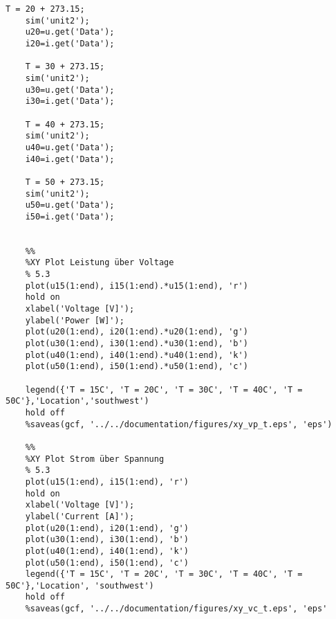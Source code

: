 \begin{appendices}
\begin{lstlisting}[caption={Matlabcode},label=code]
	T = 20 + 273.15;
	sim('unit2');
	u20=u.get('Data');
	i20=i.get('Data');
	
	T = 30 + 273.15;
	sim('unit2');
	u30=u.get('Data');
	i30=i.get('Data');
	
	T = 40 + 273.15;
	sim('unit2');
	u40=u.get('Data');
	i40=i.get('Data');
	
	T = 50 + 273.15;
	sim('unit2');
	u50=u.get('Data');
	i50=i.get('Data');
	
		
	%%
	%XY Plot Leistung über Voltage
	% 5.3
	plot(u15(1:end), i15(1:end).*u15(1:end), 'r')
	hold on
	xlabel('Voltage [V]');
	ylabel('Power [W]');
	plot(u20(1:end), i20(1:end).*u20(1:end), 'g')
	plot(u30(1:end), i30(1:end).*u30(1:end), 'b')
	plot(u40(1:end), i40(1:end).*u40(1:end), 'k')
	plot(u50(1:end), i50(1:end).*u50(1:end), 'c')

	legend({'T = 15C', 'T = 20C', 'T = 30C', 'T = 40C', 'T = 50C'},'Location','southwest')
	hold off
	%saveas(gcf, '../../documentation/figures/xy_vp_t.eps', 'eps')
	
	%%
	%XY Plot Strom über Spannung
	% 5.3
	plot(u15(1:end), i15(1:end), 'r')
	hold on
	xlabel('Voltage [V]');
	ylabel('Current [A]');
	plot(u20(1:end), i20(1:end), 'g')
	plot(u30(1:end), i30(1:end), 'b')
	plot(u40(1:end), i40(1:end), 'k')
	plot(u50(1:end), i50(1:end), 'c')
	legend({'T = 15C', 'T = 20C', 'T = 30C', 'T = 40C', 'T = 50C'},'Location', 'southwest')
	hold off
	%saveas(gcf, '../../documentation/figures/xy_vc_t.eps', 'eps'	
\end{lstlisting}
	
	
\end{appendices}